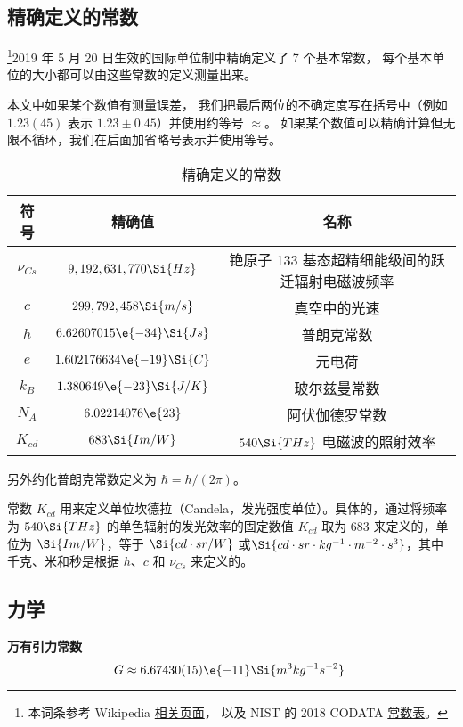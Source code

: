 

\subsection{精确定义的常数}
\footnote{本词条参考 Wikipedia \href{https://en.wikipedia.org/wiki/Physical_constant}{相关页面}， 以及 NIST 的 2018 CODATA \href{https://physics.nist.gov/cuu/Constants/Table/allascii.txt}{常数表}。}2019 年 5 月 20 日生效的国际单位制中精确定义了 7 个基本常数， 每个基本单位的大小都可以由这些常数的定义测量出来。

本文中如果某个数值有测量误差， 我们把最后两位的不确定度写在括号中（例如 $1.23(45)$ 表示 $1.23 \pm 0.45$）并使用约等号 $\approx$。 如果某个数值可以精确计算但无限不循环，我们在后面加省略号表示并使用等号。
\begin{table}[ht]
\centering
\caption{精确定义的常数}\label{tab_Consts_1}
\begin{tabular}{|c|c|c|}
\hline
符号 & 精确值 & 名称 \\
\hline
$\nu_{Cs}$ & $9,192,631,770\Si{Hz}$ & 铯原子 133 基态超精细能级间的跃迁辐射电磁波频率 \\
\hline
$c$ & $299,792,458\Si{m/s}$ & 真空中的光速 \\
\hline
$h$ & $6.62607015\e{-34}\Si{Js}$ & 普朗克常数 \\
\hline
$e$ & $1.602176634\e{-19}\Si{C} $ & 元电荷 \\
\hline
$k_B$ & $1.380649\e{-23} \Si{J/K}$ & 玻尔兹曼常数 \\
\hline
$N_A$ & $6.02214076\e{23} $ & 阿伏伽德罗常数 \\
\hline
$K_{cd}$ & $683\Si{Im/W}$ & $540\Si{THz}$ 电磁波的照射效率 \\
\hline
\end{tabular}
\end{table}
另外约化普朗克常数定义为 $\hbar = h/(2\pi)$。

常数 $K_{cd}$ 用来定义单位坎德拉（Candela，发光强度单位）。具体的，通过将频率为 $540 \Si{THz}$ 的单色辐射的发光效率的固定数值 $K_{cd}$ 取为 $683$ 来定义的，单位为 $\Si{Im/W}$，等于 $\Si{cd\cdot sr/W}$ 或$ \Si{cd\cdot sr\cdot kg^{-1} \cdot m^{-2}\cdot s^3}$，其中千克、米和秒是根据 $h$、$c$ 和 $\nu_{Cs}$ 来定义的。

\subsection{力学}
\textbf{万有引力常数}
\begin{equation}
G \approx 6.67430(15)\e{-11} \Si{m^3 kg^{-1} s^{-2}}~
\end{equation}


